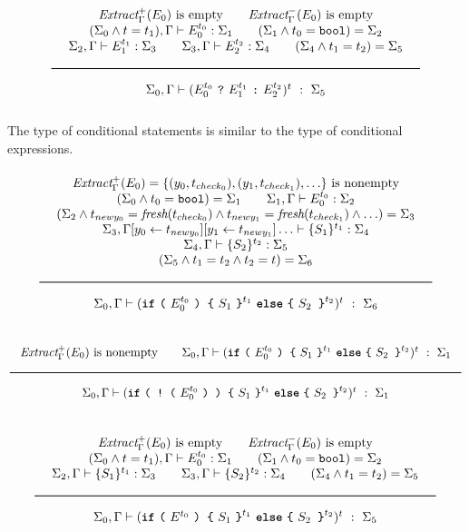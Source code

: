 \[
\Rule
{
  \begin{array}{c}
  \ExtractPos_\Gamma(E_0) \text{ is empty}
  \qquad
  \ExtractNeg_\Gamma(E_0) \text{ is empty}
  \\
  (\Sigma_0 \wedge t = t_1), \Gamma \vdash E_0^{t_0} : \Sigma_1 \qquad
  (\Sigma_1 \wedge t_0 = \Bool) = \Sigma_2
  \\
  \Sigma_2, \Gamma \vdash E_1^{t_1} : \Sigma_3 \qquad
  \Sigma_3, \Gamma \vdash E_2^{t_2} : \Sigma_4 \qquad
  (\Sigma_4 \wedge t_1 = t_2) = \Sigma_5
  \end{array}
}{
  \Sigma_0, \Gamma \vdash (E_0^{t_0}\ \ThenOp\ E_1^{t_1}\ \ElseOp\ E_2^{t_2})^t\ :\ \Sigma_5
}
\]

\noindent
The type of conditional statements is similar to the type of conditional expressions.
\[
  \Rule{
  \begin{array}{c}
  \ExtractPos_\Gamma(E_0) = \{ (y_0, t_{check_0}), (y_1, t_{check_1}), \ldots \}
  \text{ is nonempty}
  \\
  (\Sigma_0
  \wedge t_0 = \Bool
  ) = \Sigma_1
  \qquad
  \Sigma_1, \Gamma \vdash E_0^{t_0} : \Sigma_2
  \\
  (\Sigma_2
  \wedge t_{newy_0} = \textit{fresh}(t_{check_0})
  \wedge t_{newy_1} = \textit{fresh}(t_{check_1})
  \wedge \ldots
  ) = \Sigma_3
  \\
  \Sigma_3, \Gamma [ y_0 \leftarrow t_{newy_0} ][ y_1 \leftarrow t_{newy_1} ]\ldots \vdash \{S_1\}^{t_1} : \Sigma_4
  \\
  \Sigma_4, \Gamma \vdash \{S_2\}^{t_2} : \Sigma_5
  \\
  (\Sigma_5 \wedge t_1 = t_2 \wedge t_2 = t) = \Sigma_{6}
  \end{array}
  }{
  \Sigma_0, \Gamma \vdash (\If\ \texttt{(}\ E_0^{t_0}\ \texttt{)\ \{}\ S_1\ \texttt{\}}^{t_1}\ \Else\ \texttt{\{}\ S_2\texttt{ \}}^{t_2})^t\ :\ \Sigma_6}
\]

\[
\Rule{
  \ExtractPos_\Gamma(E_0) \text{ is nonempty}
  \qquad
  \Sigma_0, \Gamma \vdash (\If\ \texttt{(}\ E_0^{t_0}\ \texttt{) \{}\ S_1\ \texttt{\}}^{t_1}\ \Else\ \texttt{\{}\ S_2\texttt{ \}}^{t_2})^t\ :\ \Sigma_1
}{
  \Sigma_0, \Gamma \vdash (\If\ \texttt{(\ !\ (}\ E_0^{t_0}\ \texttt{)\ )\ \{}\ S_1\ \texttt{\}}^{t_1}\ \Else\ \texttt{\{}\ S_2\texttt{ \}}^{t_2})^t\ :\ \Sigma_1
}
\]

\[
\Rule
{
  \begin{array}{c}
  \ExtractPos_\Gamma(E_0) \text{ is empty}
  \qquad
  \ExtractNeg_\Gamma(E_0) \text{ is empty}
  \\
  (\Sigma_0 \wedge t = t_1), \Gamma \vdash E_0^{t_0} : \Sigma_1 \qquad
  (\Sigma_1 \wedge t_0 = \Bool) = \Sigma_2
  \\
  \Sigma_2, \Gamma \vdash \{S_1\}^{t_1} : \Sigma_3 \qquad
  \Sigma_3, \Gamma \vdash \{S_2\}^{t_2} : \Sigma_4 \qquad
  (\Sigma_4 \wedge t_1 = t_2) = \Sigma_5
  \end{array}
}{
  \Sigma_0, \Gamma \vdash (\If\ \texttt{(}\ E^{t_0}\ \texttt{)\ \{}\ S_1\ \texttt{\}}^{t_1}\ \Else\ \texttt{\{}\ S_2\texttt{ \}}^{t_2})^t\ :\ \Sigma_5
}
\]


